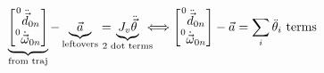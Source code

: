 \documentclass[twocolumn, 12pt]{article}    %
\begin{document}
\begin{equation*}
    \underbrace{\begin{bmatrix}
        \prescript{0}{}{\ddot{\vec{d}}}_{0n} \\ \prescript{0}{}{\dot{\vec{\omega}}}_{0n}
    \end{bmatrix}}_{\text{from traj}} - \underbrace{\vec{a}}_{\text{leftovers}} = \hspace{-10pt}\underbrace{J_v \ddot{\vec{\theta}}}_{\text{2 dot terms}} \hspace{-7.5pt} \Longleftrightarrow \begin{bmatrix}
        \prescript{0}{}{\ddot{\vec{d}}}_{0n} \\ \prescript{0}{}{\dot{\vec{\omega}}}_{0n}
    \end{bmatrix} - \vec{a} = \sum_i \ddot{\theta}_i \text{ terms}
\end{equation*}
\end{document}
